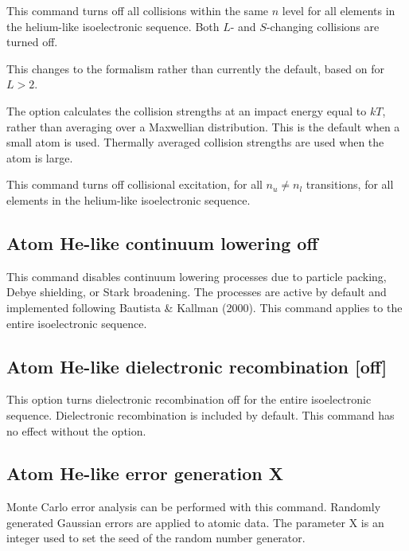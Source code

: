   This command
turns off all
collisions within the same $n$ level for all elements in the helium-like
isoelectronic sequence.
Both $L$- and $S$-changing collisions are turned off.

  This
changes to the \citet{PengellySeaton1964} formalism rather than
currently the default,
based on \citet{Vrinceanu2001} for $L > 2$.

The  option calculates the
\citet{Vrinceanu2001}
collision strengths at an impact energy equal to $kT$,
rather than averaging
over a Maxwellian distribution.
This is the default when a small atom is
used.
Thermally averaged collision strengths are used when the atom is
large.

  This command
turns off collisional
excitation, for all $n_u \not= n_l$ transitions,
for all elements in the helium-like
isoelectronic sequence.

\subsection{Atom He-like continuum lowering off  }
This command disables continuum lowering processes due to particle packing,
Debye shielding, or Stark broadening.  The processes are active by default
and implemented following Bautista \& Kallman (2000).  This command applies
to the entire isoelectronic sequence.

\subsection{Atom He-like dielectronic recombination [off] }

This option turns dielectronic recombination off for the entire
isoelectronic sequence.
Dielectronic recombination is included by default.
This command has no effect without the  option.

\subsection{Atom He-like error generation X }

Monte Carlo error analysis can be performed with this command.
Randomly
generated Gaussian errors are applied to atomic data.
The parameter X is
an integer used to set the seed of the random number generator.

